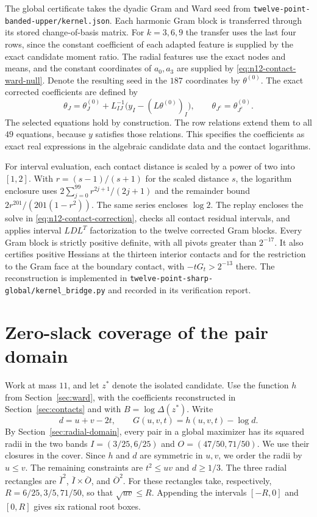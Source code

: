 \documentclass[11pt,letterpaper]{article}
\theoremstyle{remark}
\begin{document}
The global certificate takes the dyadic Gram and Ward seed from \texttt{twelve-point-banded-upper/}\allowbreak\texttt{kernel.json}. Each harmonic Gram block is transferred through its stored change-of-basis matrix. For $k=3,6,9$ the transfer uses the last four rows, since the constant coefficient of each adapted feature is supplied by the exact candidate moment ratio. The radial features use the exact nodes and means, and the constant coordinates of $a_0,a_3$ are supplied by \eqref{eq:n12-contact-ward-null}. Denote the resulting seed in the $187$ coordinates by $\theta^{(0)}$. The exact corrected coefficients are defined by
\begin{equation}
 \theta_J=\theta^{(0)}_J+L_{IJ}^{-1}
       \bigl(y_I-(L\theta^{(0)})_I\bigr),\qquad
 \theta_{J^c}=\theta^{(0)}_{J^c}.
 \label{eq:n12-contact-correction}
\end{equation}
The selected equations hold by construction. The row relations extend them to all $49$ equations, because $y$ satisfies those relations. This specifies the coefficients as exact real expressions in the algebraic candidate data and the contact logarithms.

For interval evaluation, each contact distance is scaled by a power of two into $[1,2]$. With $r=(s-1)/(s+1)$ for the scaled distance $s$, the logarithm enclosure uses $2\sum_{j=0}^{99}r^{2j+1}/(2j+1)$ and the remainder bound $2r^{201}/(201(1-r^2))$. The same series encloses $\log2$. The replay encloses the solve in \eqref{eq:n12-contact-correction}, checks all contact residual intervals, and applies interval $LDL^T$ factorization to the twelve corrected Gram blocks. Every Gram block is strictly positive definite, with all pivots greater than $2^{-17}$. It also certifies positive Hessians at the thirteen interior contacts and for the restriction to the Gram face at the boundary contact, with $-tG_t>2^{-13}$ there. The reconstruction is implemented in \texttt{twelve-point-sharp-global/}\allowbreak\texttt{kernel\_bridge.py} and recorded in its verification report.

\section{Zero-slack coverage of the pair domain}
\label{sec:cover}

Work at mass \(11\), and let \(z^*\) denote the isolated candidate.
Use the function \(h\) from Section~\ref{sec:ward}, with the coefficients
reconstructed in Section~\ref{sec:contacts} and with
\(B=\log\Delta(z^*)\). Write
\[
 d=u+v-2t,\qquad G(u,v,t)=h(u,v,t)-\log d.
\]
By Section~\ref{sec:radial-domain}, every pair in a global maximizer has
its squared radii in the two bands
\(I=(3/25,6/25)\) and \(O=(47/50,71/50)\).
We use their closures in the cover. Since \(h\) and \(d\) are symmetric
in \(u,v\), we order the radii by \(u\le v\). The remaining constraints
are \(t^2\le uv\) and \(d\ge 1/3\). The three radial rectangles are
\(\overline I^2\), \(\overline I\times\overline O\), and
\(\overline O^2\). For these rectangles take, respectively,
\(R=6/25,3/5,71/50\), so that \(\sqrt{uv}\le R\). Appending the
intervals \([-R,0]\) and \([0,R]\) gives six rational root boxes.
\end{document}
